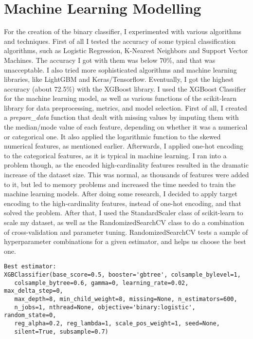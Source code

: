 \documentclass[11pt]{article}
\begin{document}
    \pagebreak

    \section{Machine Learning Modelling}\label{machine-learning-modelling}

For the creation of the binary classifier, I experimented with various
algorithms and techniques. First of all I tested the accuracy of some
typical classification algorithms, such as Logistic Regression,
K-Nearest Neighbors and Support Vector Machines. The accuracy I got with
them was below 70\%, and that was unacceptable. I also tried more
sophisticated algorithms and machine learning libraries, like LightGBM
and Keras/Tensorflow. Eventually, I got the highest accuracy (about
72.5\%) with the XGBoost library. I used the XGBoost Classifier for the
machine learning model, as well as various functions of the scikit-learn library
for data preprocessing, metrics, and model selection. First of all, I
created a \emph{prepare\_data} function that dealt with missing values
by imputing them with the median/mode value of each feature, depending
on whether it was a numerical or categorical one. It also applied the
logarithmic function to the skewed numerical features, as mentioned
earlier. Afterwards, I applied one-hot encoding to the categorical
features, as it is typical in machine learning. I ran into a problem
though, as the encoded high-cardinality features resulted in the
dramatic increase of the dataset size. This was normal, as thousands of
features were added to it, but led to memory problems and increased the
time needed to train the machine learning models. After doing some
research, I decided to apply target encoding to the high-cardinality
features, instead of one-hot encoding, and that solved the problem. After that, I
used the StandardScaler class of scikit-learn to scale my dataset, as
well as the RandomizedSearchCV class to do a combination of
cross-validation and parameter tuning. RandomizedSearchCV tests a sample
of hyperparameter combinations for a given estimator, and helps us
choose the best one.

    \begin{verbatim}
Best estimator:
XGBClassifier(base_score=0.5, booster='gbtree', colsample_bylevel=1,
   colsample_bytree=0.6, gamma=0, learning_rate=0.02, max_delta_step=0,
   max_depth=8, min_child_weight=8, missing=None, n_estimators=600,
   n_jobs=1, nthread=None, objective='binary:logistic', random_state=0,
   reg_alpha=0.2, reg_lambda=1, scale_pos_weight=1, seed=None,
   silent=True, subsample=0.7)

\end{verbatim}
\end{document}
